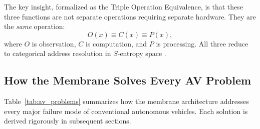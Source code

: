 \documentclass[12pt]{article}
\theoremstyle{definition}
\theoremstyle{remark}
\begin{document}
The key insight, formalized as the Triple Operation Equivalence, is that these three functions are not separate operations requiring separate hardware. They are the \emph{same} operation:
\begin{equation}
  O(x) \equiv C(x) \equiv P(x),
  \label{eq:triple_operation}
\end{equation}
where $O$ is observation, $C$ is computation, and $P$ is processing. All three reduce to categorical address resolution in $S$-entropy space \cite{sachikonye2026partition, sachikonye2026single}.

\subsection{How the Membrane Solves Every AV Problem}

Table~\ref{tab:av_problems} summarizes how the membrane architecture addresses every major failure mode of conventional autonomous vehicles. Each solution is derived rigorously in subsequent sections.
\end{document}
